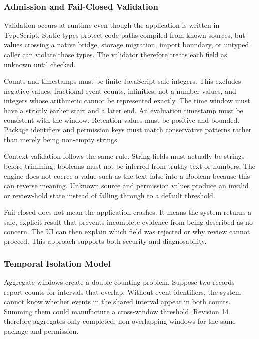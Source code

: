 \subsubsection{Admission and Fail-Closed Validation}

Validation occurs at runtime even though the application is written in TypeScript. Static types protect code paths compiled from known sources, but values crossing a native bridge, storage migration, import boundary, or untyped caller can violate those types. The validator therefore treats each field as unknown until checked.

Counts and timestamps must be finite JavaScript safe integers. This excludes negative values, fractional event counts, infinities, not-a-number values, and integers whose arithmetic cannot be represented exactly. The time window must have a strictly earlier start and a later end. An evaluation timestamp must be consistent with the window. Retention values must be positive and bounded. Package identifiers and permission keys must match conservative patterns rather than merely being non-empty strings.

Context validation follows the same rule. String fields must actually be strings before trimming; booleans must not be inferred from truthy text or numbers. The engine does not coerce a value such as the text false into a Boolean because this can reverse meaning. Unknown source and permission values produce an invalid or review-hold state instead of falling through to a default threshold.

Fail-closed does not mean the application crashes. It means the system returns a safe, explicit result that prevents incomplete evidence from being described as no concern. The UI can then explain which field was rejected or why review cannot proceed. This approach supports both security and diagnosability.

\subsubsection{Temporal Isolation Model}

Aggregate windows create a double-counting problem. Suppose two records report counts for intervals that overlap. Without event identifiers, the system cannot know whether events in the shared interval appear in both counts. Summing them could manufacture a cross-window threshold. Revision 14 therefore aggregates only completed, non-overlapping windows for the same package and permission.

